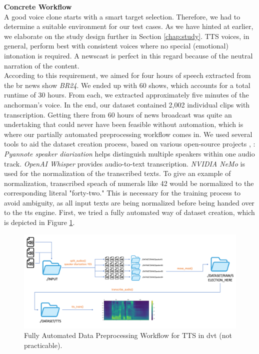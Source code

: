\documentclass[
  a4paper,  %
  twoside,  %
  bibliography=totoc,
  headsepline,
  cleardoublepage=empty,
  parskip=half,
  draft=false
]{scrbook}
\begin{document}
\textbf{Concrete Workflow} \\
A good voice clone starts with a smart target selection. Therefore, we had to determine a suitable environment for our test cases. As we have hinted at earlier, we elaborate on the study design further in Section \ref{chap:study}. TTS voices, in general, perform best with consistent voices where no special (emotional) intonation is required. A newscast is perfect in this regard because of the neutral narration of the content. \\
According to this requirement, we aimed for four hours of speech extracted from the \gls{br} news show \textit{BR24}. We ended up with 60 shows, which accounts for a total runtime of 30 hours. From each, we extracted approximately five minutes of the anchorman's voice. In the end, our dataset contained 2,002 individual clips with transcription. Getting there from 60 hours of news broadcast was quite an undertaking that could never have been feasible without automation, which is where our partially automated preprocessing workflow comes in. We used several tools to aid the dataset creation process, based on various open-source projects \cite{micaAudioSplitterUsing2023}, \cite{harperEndtoEndToolkitVoice2023}: \textit{Pyannote speaker diarization} helps distinguish multiple speakers within one audio track. \textit{OpenAI Whisper} provides audio-to-text transcription. \textit{NVIDIA NeMo} is used for the normalization of the transcribed texts. To give an example of normalization, transcribed speach of numerals like 42 would be normalized to the corresponding literal "forty-two." This is necessary for the training process to avoid ambiguity, as all input texts are being normalized before being handed over to the \gls{tts} engine. First, we tried a fully automated way of dataset creation, which is depicted in Figure \ref{fig:dvt-tts-original}.

\begin{figure}[h]
  \centering
  \includegraphics[width=1\textwidth]{./graphics/tts/tts dvt only.png}
  \caption{Fully Automated Data Preprocessing Workflow for TTS in \gls{dvt} (not practicable).}
  \label{fig:dvt-tts-original}
\end{figure}
\end{document}
